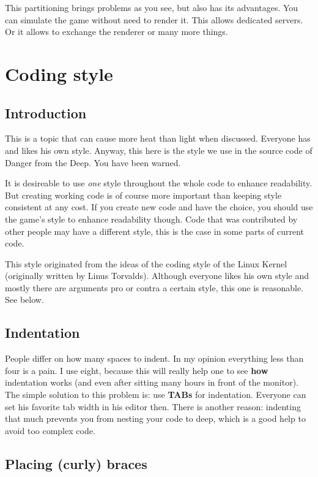 \documentclass[english,a4paper,12pt]{report}
\newcommand{\dftd}{\textsf{Danger from the Deep}}
\begin{document}
This partitioning brings problems as you see, but also has its
advantages. You can simulate the game without need to render it. This
allows dedicated servers. Or it allows to exchange the renderer or many
more things.


\chapter{Coding style}

\section{Introduction}
This is a topic that can cause more heat than light when discussed.
Everyone has and likes his own style. Anyway, this here is the style we
use in the source code of \dftd. You have been warned.

It is desireable to use \emph{one} style throughout the whole code to
enhance readability. But creating working code is of course more
important than keeping style consistent at any cost. If you create new
code and have the choice, you should use the game's style to enhance
readability though.  Code that was contributed by other people may have
a different style, this is the case in some parts of current code.

This style originated from the ideas of the coding style of the Linux
Kernel (originally written by Linus Torvalds). Although everyone likes
his own style and mostly there are arguments pro or contra a certain
style, this one is reasonable. See below.
    

\section{Indentation}
People differ on how many spaces to indent. In my opinion everything
less than four is a pain. I use eight, because this will really help one
to see \textbf{how} indentation works (and even after sitting many hours
in front of the monitor). The simple solution to this problem is: use
\textbf{TABs} for indentation. Everyone can set his favorite tab width
in his editor then. There is another reason: indenting that much
prevents you from nesting your code to deep, which is a good help to
avoid too complex code.
    

\section{Placing (curly) braces}
\end{document}
